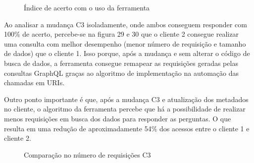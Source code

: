 \begin{figure}[H]
  \centering
  \caption{Índice de acerto com o uso da ferramenta}
\end{figure}

Ao analisar a mudança C3 isoladamente, onde ambos conseguem responder com 100\% de acerto, percebe-se na figura 29 e 30 que o cliente 2 consegue realizar uma consulta com melhor desempenho (menor número de requisição e tamanho de dados) que o cliente 1. Isso porque, após a mudança e sem alterar o código de busca de dados, a ferramenta consegue remapear as requisições geradas pelas consultas GraphQL graças ao algoritmo de implementação na automação das chamadas em URIs.

Outro ponto importante é que, após a mudança C3 e atualização dos metadados no cliente, o algoritmo da ferramenta percebe que há a possibilidade de realizar menos requisições em busca dos dados para responder as perguntas. O que resulta em uma redução de aproximadamente 54\% dos acessos entre o cliente 1 e cliente 2.

\begin{figure}[H]
  \centering
  \caption{Comparação no número de requisições C3}
\end{figure}

